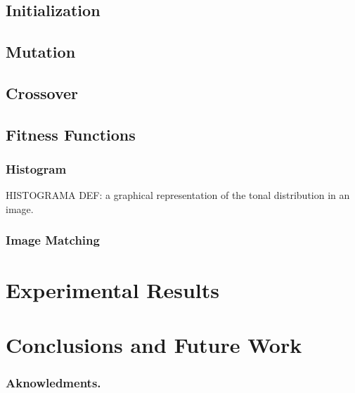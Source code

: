 \documentclass{llncs}
\begin{document}
\subsection{Initialization}\label{go:init}
\subsection{Mutation}\label{go:mutation}
\subsection{Crossover}\label{go:crossover}
\subsection{Fitness Functions}\label{go:fitness}
\subsubsection{Histogram}\label{go:fitness:hist}
HISTOGRAMA DEF: a graphical representation of the tonal distribution in an image.
\subsubsection{Image Matching}\label{go:fitness:image_match}

\section{Experimental Results} \label{exper}

\section{Conclusions and Future Work}\label{conclusions}

\subsubsection*{Aknowledments.} 




\end{document}
